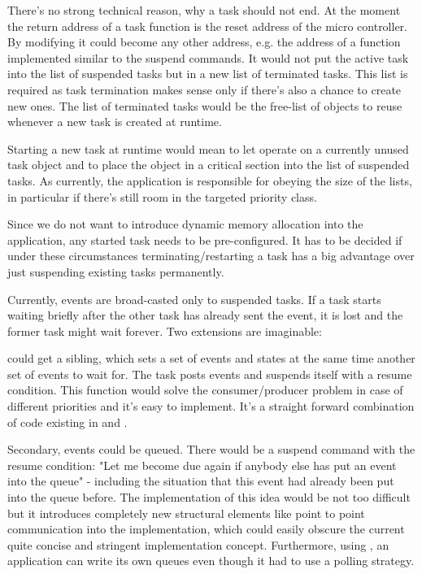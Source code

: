 There's no strong technical reason, why a task should not end. At the
moment the return address of a task function is the reset address of the
micro controller. By modifying  it could become any other
address, e.g. the address of a function implemented similar to the suspend
commands. It would not put the active task into the list of suspended
tasks but in a new list of terminated tasks. This list is required as task
termination makes sense only if there's also a chance to create new ones.
The list of terminated tasks would be the free-list of objects to reuse
whenever a new task is created at runtime.

Starting a new task at runtime would mean to let 
operate on a currently unused task object and to place the object in a
critical section into the list of suspended tasks. As currently, the
application is responsible for obeying the size of the lists, in
particular if there's still room in the targeted priority class.

Since we do not want to introduce dynamic memory allocation into the
application, any started task needs to be pre-configured. It has to be
decided if under these circumstances terminating/restarting a task has a
big advantage over just suspending existing tasks permanently.

Currently, events are broad-casted only to suspended tasks. If a task
starts waiting briefly after the other task has already sent the event, it
is lost and the former task might wait forever. Two extensions are
imaginable:

 could get a sibling, which sets a set of events and
states at the same time another set of events to wait for. The task posts
events and suspends itself with a resume condition. This function would
solve the consumer/producer problem in case of different priorities and
it's easy to implement. It's a straight forward combination of code
existing in  and .

Secondary, events could be queued. There would be a suspend command with
the resume condition: "Let me become due again if anybody else has put an
event into the queue" - including the situation that this event had
already been put into the queue before. The implementation of this idea
would be not too difficult but it introduces completely new structural
elements like point to point communication into the implementation, which
could easily obscure the current quite concise and stringent
implementation concept. Furthermore, using
, an \rtos{} application can write
its own queues even though it had to use a polling strategy.


